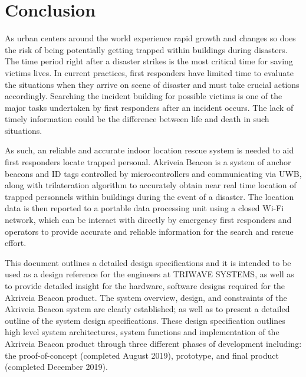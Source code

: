 

\setcounter{section}{6}
\section{Conclusion}

\bigskip
As urban centers around the world experience rapid growth and changes so does the risk of being potentially getting trapped within buildings during disasters. The time period right after a disaster strikes is the most critical time for saving victims lives. In current practices, first responders have limited time to evaluate the situations when they arrive on scene of disaster and must take crucial actions accordingly. Searching the incident building for possible victims is one of the major tasks undertaken by first responders after an incident occurs. The lack of timely information could be the difference between life and death in such situations.

\medskip
As such, an reliable and accurate indoor location rescue system is needed to aid first responders locate trapped personal. Akriveia Beacon is a system of anchor beacons and ID tags controlled by microcontrollers and communicating via UWB, along with trilateration algorithm to accurately obtain near real time location of trapped personnels within buildings during the event of a disaster. The location data is then reported to a portable data processing unit using a closed Wi-Fi network, which can be interact with directly by emergency first responders and operators to provide accurate and reliable information for the search and rescue effort. 

\medskip
This document outlines a detailed design specifications and it is intended to be used as a design
reference for the engineers at TRIWAVE SYSTEMS, as well as to provide detailed insight for the hardware, software designs required for the Akriveia Beacon product. The system overview, design, and constraints of the Akriveia Beacon system are clearly established; as well as to present a detailed outline of the system design specifications. These design specification outlines high level system architectures, system functions and implementation of the Akriveia Beacon product through three different phases of development including: the proof-of-concept (completed August 2019), prototype, and final product (completed December 2019).


